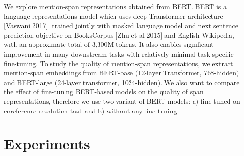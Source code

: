 \documentclass[11pt]{article}
\begin{document}
We explore mention-span representations obtained from BERT. BERT \parencite{devlin2019bert} is a language representations model which uses deep Transformer architecture [Vaswani 2017], trained jointly with masked language model and next sentence prediction objective on BooksCorpus [Zhu et al 2015] and English Wikipedia, with an approximate total of 3,300M tokens. It also enables significant improvement in many downstream tasks with relatively minimal task-specific fine-tuning. To study the quality of mention-span representations, we extract mention-span embeddings from BERT-base (12-layer Transformer, 768-hidden) and BERT-large (24-layer transformer, 1024-hidden). We also want to compare the effect of fine-tuning BERT-based models on the quality of span representations, therefore we use two variant of BERT models: a) fine-tuned on coreference resolution task and b) without any fine-tuning.



\section{Experiments}


\end{document}
